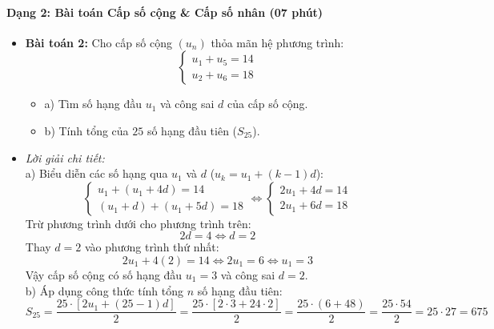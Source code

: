 \documentclass[12pt, a4paper]{article}
\begin{document}
\paragraph{Dạng 2: Bài toán Cấp số cộng \& Cấp số nhân (07 phút)}
\begin{itemize}
    \item \textbf{Bài toán 2:} Cho cấp số cộng $(u_n)$ thỏa mãn hệ phương trình:
    $$\begin{cases} u_1 + u_5 = 14 \\ u_2 + u_6 = 18 \end{cases}$$
    \begin{itemize}
        \item a) Tìm số hạng đầu $u_1$ và công sai $d$ của cấp số cộng.
        \item b) Tính tổng của $25$ số hạng đầu tiên ($S_{25}$).
    \end{itemize}
    \item \textit{Lời giải chi tiết:}\\
    a) Biểu diễn các số hạng qua $u_1$ và $d$ ($u_k = u_1 + (k - 1)d$):
    $$\begin{cases} u_1 + (u_1 + 4d) = 14 \\ (u_1 + d) + (u_1 + 5d) = 18 \end{cases} \iff \begin{cases} 2u_1 + 4d = 14 \\ 2u_1 + 6d = 18 \end{cases}$$
    Trừ phương trình dưới cho phương trình trên:
    $$2d = 4 \iff d = 2$$
    Thay $d = 2$ vào phương trình thứ nhất:
    $$2u_1 + 4(2) = 14 \iff 2u_1 = 6 \iff u_1 = 3$$
    Vậy cấp số cộng có số hạng đầu $u_1 = 3$ và công sai $d = 2$.\\
    b) Áp dụng công thức tính tổng $n$ số hạng đầu tiên:
    $$S_{25} = \dfrac{25 \cdot [2u_1 + (25 - 1)d]}{2} = \dfrac{25 \cdot [2 \cdot 3 + 24 \cdot 2]}{2} = \dfrac{25 \cdot (6 + 48)}{2} = \dfrac{25 \cdot 54}{2} = 25 \cdot 27 = 675$$
\end{itemize}
\end{document}
